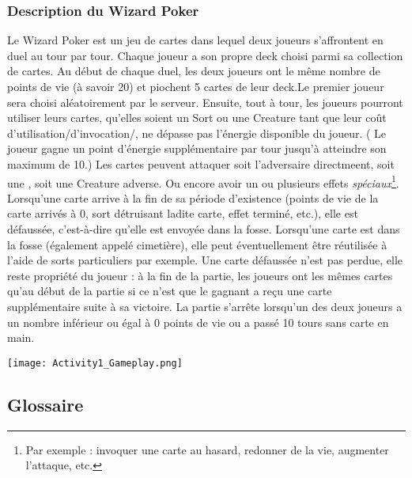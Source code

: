 \documentclass{article}
\begin{document}
		\subsubsection{Description du Wizard Poker}
			Le Wizard Poker est un jeu de cartes dans lequel deux joueurs s'affrontent en \gls{duel} au tour par tour. Chaque joueur a son propre \gls{deck}
			choisi parmi sa collection de cartes. Au début de chaque duel, les deux joueurs ont le même nombre de points de vie (à savoir 20) et piochent 5
			cartes de leur \gls{deck}.Le premier joueur sera choisi aléatoirement par le serveur. Ensuite, tout à tour, les joueurs pourront utiliser leurs cartes, qu'elles soient un \gls{Sort} ou une
			\gls{Creature} tant que leur coût d'utilisation/d'invocation/, ne dépasse pas l'énergie disponible du joueur. ( Le joueur gagne un point d'énergie supplémentaire par tour jusqu'à atteindre son maximum de 10.)
			Les cartes peuvent attaquer soit l'adversaire directmeent, soit une , soit une \gls{Creature} adverse. Ou encore avoir un ou plusieurs effets \textit{spéciaux}\footnote{Par exemple : \gls{invoquer} une carte au hasard, redonner de la vie, augmenter l'attaque, etc.}. Lorsqu'une carte
			arrive à la fin de sa période d'existence (points de vie de la carte arrivés à 0, sort détruisant ladite carte, effet terminé, etc.), elle est
			défaussée, c'est-à-dire qu'elle est envoyée dans la \gls{fosse}.
			Lorsqu'une carte est dans la \gls{fosse} (également appelé cimetière), elle
			peut éventuellement être réutilisée à l'aide de sorts particuliers par exemple. Une carte défaussée n'est pas perdue, elle reste propriété du joueur :
			à la fin de la partie, les joueurs ont les mêmes cartes qu'au début de la partie si ce n'est que le gagnant a reçu une carte supplémentaire
			suite à sa victoire. La partie s'arrête lorsqu'un des deux joueurs a un nombre inférieur ou égal à 0 points de vie ou a passé 10 tours sans carte en main.

			\begin{center}\texttt{[image: Activity1\_Gameplay.png]}\end{center}

	\subsection{Glossaire}  %
		\printglossary[type=glossary, style=noIndex, title=]
\end{document}
